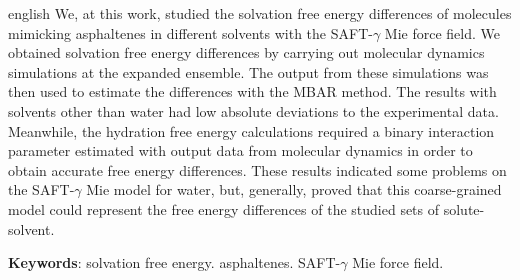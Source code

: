 \documentclass[
	12pt,				%
	openany,			%
	oneside,			%
	a4paper,			%
	english,			%
	brazil				%
	]{abntex2}
\begin{document}
\begin{resumo}[Abstract]
 \begin{otherlanguage*}{english}
  We, at this work, studied the solvation free energy differences of molecules mimicking asphaltenes in different solvents with the SAFT-$\gamma$ Mie force field. We obtained solvation free energy differences by carrying out molecular dynamics simulations at the expanded ensemble. The output from these simulations was then used to estimate the differences with the MBAR method. The results with solvents other than water had low absolute deviations to the experimental data. Meanwhile, the hydration free energy calculations required a binary interaction parameter estimated with output data from molecular dynamics in order to obtain accurate free energy differences. These results indicated some problems on the SAFT-$\gamma$ Mie model for water, but, generally, proved that this coarse-grained model could represent the free energy differences of the studied sets of solute-solvent.

   \vspace{\onelineskip}
 
   \noindent 
   \textbf{Keywords}: solvation free energy. asphaltenes. SAFT-$\gamma$ Mie force field.
 \end{otherlanguage*}
\end{resumo}

\listoffigures*
\cleardoublepage

\listoftables*
\cleardoublepage
\end{document}
